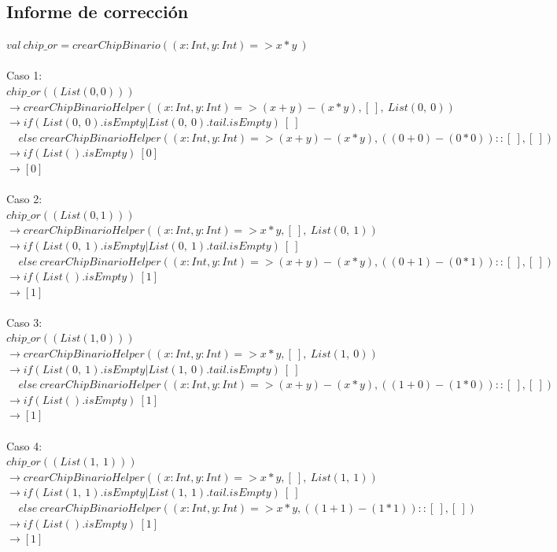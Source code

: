 \documentclass[12pt, a4paper]{article}
\begin{document}
\subsection{Informe de corrección}
$val~chip\_or = crearChipBinario((x: Int, y: Int) => x*y~)$ \\ \\
Caso 1: \\ 
$chip\_or((List(0, 0)))$ \\
$\rightarrow crearChipBinarioHelper((x: Int, y: Int) => (x+y) - (x*y), [~], ~List(0,~0))$ \\
$\rightarrow if ( List(0,~0).isEmpty | List(0, ~0).tail.isEmpty)~[~] $ \\
$~~~~~else~crearChipBinarioHelper((x: Int, y: Int) => (x+y) - (x*y),  ((0+0)-(0*0))::[~], [~])$ \\
$\rightarrow if (List().isEmpty)~[0] $ \\
$\rightarrow [0]$ \\ \\
Caso 2: \\ 
$chip\_or((List(0, 1)))$ \\
$\rightarrow crearChipBinarioHelper((x: Int, y: Int) => x*y, [~], ~List(0,~1))$ \\
$\rightarrow if ( List(0,~1).isEmpty | List(0, ~1).tail.isEmpty)~[~] $ \\
$~~~~~else~crearChipBinarioHelper((x: Int, y: Int) => (x+y)-(x*y),  ((0+1)-(0*1))::[~], [~])$ \\
$\rightarrow if (List().isEmpty)~[1] $ \\
$\rightarrow [1]$ \\ \\
Caso 3: \\ 
$chip\_or((List(1, 0)))$ \\
$\rightarrow crearChipBinarioHelper((x: Int, y: Int) => x*y, [~], ~List(1,~0))$ \\
$\rightarrow if ( List(0,~1).isEmpty | List(1, ~0).tail.isEmpty)~[~] $ \\
$~~~~~else~crearChipBinarioHelper((x: Int, y: Int) => (x+y)-(x*y),  ((1+0)-(1*0))::[~], [~])$ \\
$\rightarrow if (List().isEmpty)~[1] $ \\
$\rightarrow [1]$ \\ \\
Caso 4: \\ 
$chip\_or((List(1,~1)))$ \\
$\rightarrow crearChipBinarioHelper((x: Int, y: Int) => x*y, [~], ~List(1,~1))$ \\
$\rightarrow if ( List(1,~1).isEmpty | List(1, ~1).tail.isEmpty)~[~] $ \\
$~~~~~else~crearChipBinarioHelper((x: Int, y: Int) => x*y,  ((1+1)-(1*1))::[~], [~])$ \\
$\rightarrow if (List().isEmpty)~[1] $ \\
$\rightarrow [1]$ \\ \\
\end{document}

